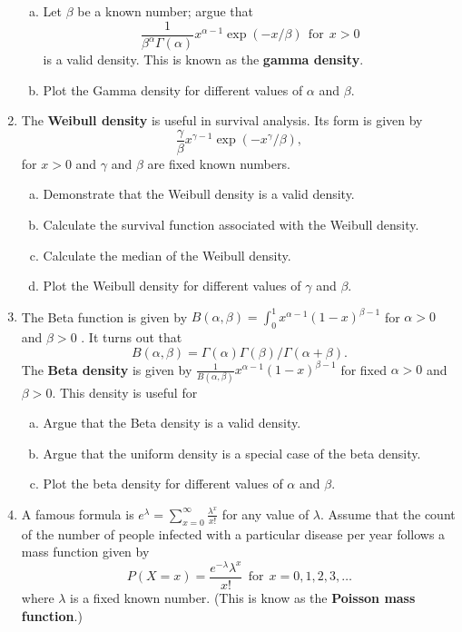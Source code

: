 \documentclass[12pt]{article}
\begin{document}
\begin{enumerate}[Problem 1.]
\begin{enumerate}[a.]
    \item Let $\beta$ be a known number; argue that
    $$
    \frac{1}{\beta^\alpha\Gamma(\alpha)} x^{\alpha - 1} \exp(-x/\beta) ~~ \mbox{for} ~~ x > 0
    $$
    is a valid density. This is known as the {\bf gamma density}.
    \item Plot the Gamma density for different values of $\alpha$ and $\beta$.
    \end{enumerate}
\item The {\bf Weibull density} is useful in survival analysis. Its form is given by
$$
\frac{\gamma}{\beta}x^{\gamma - 1}\exp\left(-x^\gamma / \beta\right),
$$
for $x > 0$ and $\gamma$ and $\beta$ are fixed known numbers.
\begin{enumerate}[a.]
    \item Demonstrate that the Weibull density is a valid density.
    \item Calculate the survival function associated with the Weibull density.
    \item Calculate the median of the Weibull density.
    \item Plot the Weibull density for different values of $\gamma$ and $\beta$.
\end{enumerate}
\item The Beta function is given by $B(\alpha, \beta) =  \int_0^1 x^{\alpha-1} (1 - x)^{\beta - 1}$
for $\alpha > 0$ and $\beta > 0$ . It turns out that
$$
B(\alpha, \beta) = \Gamma(\alpha)\Gamma(\beta)/\Gamma(\alpha + \beta).
$$
The {\bf Beta density} is given by $\frac{1}{B(\alpha,\beta)}x^{\alpha-1}(1 - x)^{\beta-1}$ for fixed
$\alpha > 0$ and $\beta > 0$. This density is useful for
\begin{enumerate}[a.]
\item Argue that the Beta density is a valid density.
\item Argue that the uniform density is a special case of the beta density.
\item Plot the beta density for different values of $\alpha$ and $\beta$.
\end{enumerate}
\item A famous formula is $e^{\lambda} = \sum_{x=0}^\infty \frac{\lambda^{x}}{x!}$ for any value
    of $\lambda$. Assume that the count of the number of people infected
with a particular disease per year follows a mass function given by
$$
P(X = x) = \frac{e^{-\lambda} \lambda^x}{x!} ~~ \mbox{for} ~~ x = 0, 1, 2, 3, \ldots
$$
where $\lambda$ is a fixed known number. (This is know as the {\bf Poisson mass function}.)

\end{enumerate}
\end{document}
